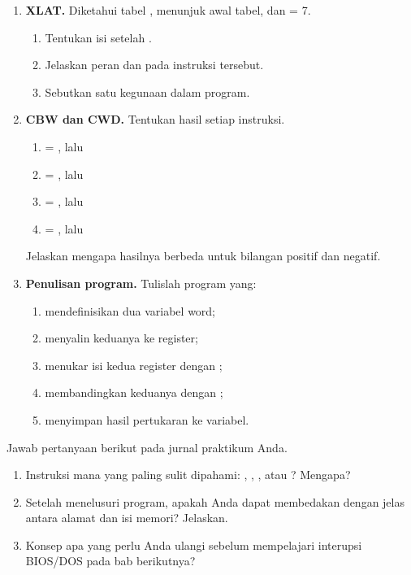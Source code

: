 \begin{enumerate}
    \item \textbf{XLAT.} Diketahui tabel
          ,
           menunjuk awal tabel, dan  = 7.
          \begin{enumerate}
              \item Tentukan isi  setelah .
              \item Jelaskan peran  dan  pada
                    instruksi tersebut.
              \item Sebutkan satu kegunaan  dalam program.
          \end{enumerate}

    \item \textbf{CBW dan CWD.} Tentukan hasil setiap instruksi.
          \begin{enumerate}
              \item {} = , lalu 
              \item {} = , lalu 
              \item {} = , lalu 
              \item {} = , lalu 
          \end{enumerate}
          Jelaskan mengapa hasilnya berbeda untuk bilangan positif
          dan negatif.

    \item \textbf{Penulisan program.} Tulislah program yang:
          \begin{enumerate}
              \item mendefinisikan dua variabel word;
              \item menyalin keduanya ke register;
              \item menukar isi kedua register dengan ;
              \item membandingkan keduanya dengan ;
              \item menyimpan hasil pertukaran ke variabel.
          \end{enumerate}
\end{enumerate}

\begin{refleksibox}
\vspace{1.1em}
Jawab pertanyaan berikut pada jurnal praktikum Anda.
\begin{enumerate}
    \item Instruksi mana yang paling sulit dipahami: ,
          , , atau ? Mengapa?
    \item Setelah menelusuri program, apakah Anda dapat membedakan
          dengan jelas antara alamat dan isi memori? Jelaskan.
    \item Konsep apa yang perlu Anda ulangi sebelum mempelajari
          interupsi BIOS/DOS pada bab berikutnya?
\end{enumerate}
\end{refleksibox}
